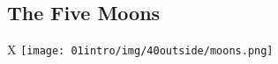 \subsection*{The Five Moons}
\begin{linenumbers}
\begin{table*}[b]%
    \begin{DndTable}[width=\linewidth]{X}
        \centering
        \texttt{[image: 01intro/img/40outside/moons.png]}
    \end{DndTable}
\end{table*}

\newpage~\newpage
\end{linenumbers}
